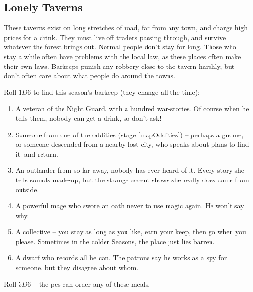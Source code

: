 \begin{multicols}{2}

\subsection{Lonely Taverns}
\label{lonelyTaverns}

These taverns exist on long stretches of road, far from any town, and
charge high prices for a drink. They must live off traders passing
through, and survive whatever the forest brings out. Normal people don't
stay for long. Those who stay a while often have problems with the local
law, as these places often make their own laws. Barkeeps punish any
robbery close to the tavern harshly, but don't often care about what
people do around the towns.


Roll $1D6$ to find this season's barkeep (they change all the time):

\begin{enumerate}
\item
  A veteran of the Night Guard, with a hundred war-stories. Of course
  when he tells them, nobody can get a drink, so don't ask!
\item
  Someone from one of the oddities (stage \ref{mapOddities}) -- perhaps a gnome, or someone
  descended from a nearby lost city, who speaks about plans to find it, and return.
\item
  An outlander from so far away, nobody has ever heard of it. Every
  story she tells sounds made-up, but the strange accent shows she really
  does come from outside.
\item
  A powerful mage who swore an oath never to use magic again. He won't
  say why.
\item
  A collective -- you stay as long as you like, earn your keep, then go
  when you please. Sometimes in the colder Seasons, the place just lies
  barren.
\item
  A dwarf who records all he can. The patrons say he works as a spy for
  someone, but they disagree about whom.
\end{enumerate}


Roll $3D6$ -- the \glspl{pc} can order any of these meals.


\end{multicols}
